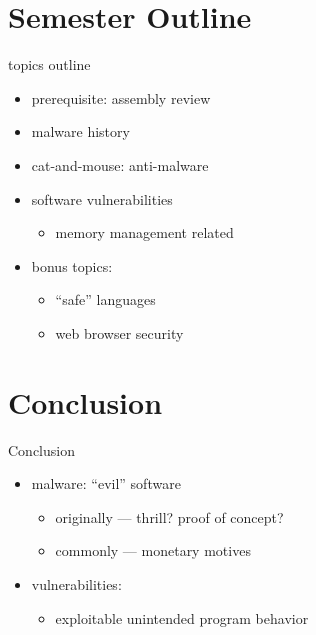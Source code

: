 \section{Semester Outline}

\begin{frame}{topics outline}
    \begin{itemize}
    \item prerequisite: assembly review
    \item malware history
    \item cat-and-mouse: anti-malware
    \item software vulnerabilities
    \begin{itemize}
        \item memory management related
    \end{itemize}
    \item bonus topics: 
        \begin{itemize}
        \item ``safe'' languages
        \item web browser security
        \end{itemize}
    \end{itemize}
\end{frame}

\section{Conclusion}

\begin{frame}{Conclusion}
    \begin{itemize}
    \item malware: ``evil'' software
        \begin{itemize}
        \item originally --- thrill? proof of concept?
        \item commonly --- monetary motives
        \end{itemize}
    \item vulnerabilities:
        \begin{itemize}
        \item exploitable unintended program behavior
        \end{itemize}
    \end{itemize}
\end{frame}
